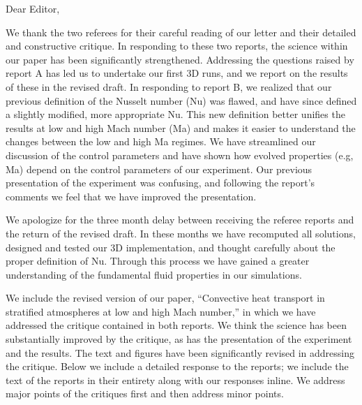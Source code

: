 \documentclass[aps, 11pt, singlecolumn]{revtex4-1} %
\begin{document}
\noindent
Dear Editor,
$\,$\newline

\newenvironment{myquotation}{
\begin{quotation}
\itshape
}{ 
\end{quotation}
}

\begin{singlespace}
We thank the two referees for their careful reading of our letter
and their detailed and constructive critique.
In responding to these two reports, the science within
our paper has been significantly strengthened.
Addressing the questions raised by report A has led us to undertake
our first 3D runs, and we report on the results of these in the
revised draft.  In responding to report B,
we realized that our previous definition of the
Nusselt number (Nu) was flawed, and have since defined
a slightly modified, more appropriate Nu.  This new definition better unifies
the results at low and high Mach number (Ma) and makes it easier to understand
the changes between the low and high Ma regimes. We have streamlined our discussion
of the control parameters and have shown how evolved properties (e.g, Ma) depend
on the control parameters of our experiment.  Our previous presentation of the
experiment was confusing, and following the report's comments we feel that we
have improved the presentation.

We apologize for the three month delay between receiving the referee reports
and the return of the revised draft.  In these months we have
recomputed all solutions, designed and tested our 3D implementation, and
thought carefully about the proper definition of Nu.  Through this
process we have gained a greater understanding of the fundamental
fluid properties in our simulations.  


We include the revised version of our paper, ``Convective heat transport in stratified
atmospheres at low and high Mach number,'' in which we have addressed the critique contained
in both reports.  We think the science has been substantially improved by the critique, as has
the presentation of the experiment and the results.  The text and figures have been significantly
revised in addressing the critique.  
Below we include a detailed response to the reports; we include the text of
the reports in their entirety along with our responses inline.  We address major
points of the critiques first and then address minor points.



\end{singlespace}
\end{document}
